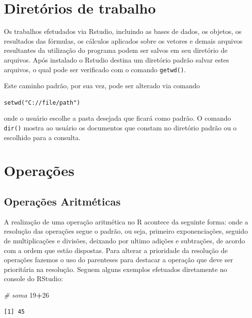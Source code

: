 \documentclass[12pt,portuguese,oneside]{book}
\newenvironment{Shaded}{\begin{snugshade}}{\end{snugshade}}
\newcommand{\DecValTok}[1]{\textcolor[rgb]{0.00,0.00,0.81}{#1}}
\newcommand{\CommentTok}[1]{\textcolor[rgb]{0.56,0.35,0.01}{\textit{#1}}}
\newcommand{\OperatorTok}[1]{\textcolor[rgb]{0.81,0.36,0.00}{\textbf{#1}}}
\begin{document}
\section{Diretórios de trabalho}\label{diretorios-de-trabalho}

Os trabalhos efetudados via Rstudio, incluindo as bases de dados, os
objetos, os resultados das fórmulas, os cálculos aplicados sobre os
vetores e demais arquivos resultantes da utilização do programa podem
ser salvos em seu diretório de arquivos. Após instalado o Rstudio
destina um diretório padrão salvar estes arquivos, o qual pode ser
verificado com o comando \texttt{getwd()}.

Este caminho padrão, por sua vez, pode ser alterado via comando

\texttt{setwd("C://file/path")}

onde o usuário escolhe a pasta desejada que ficará como padrão. O
comando \texttt{dir()} mostra ao usuário os documentos que constam no
diretório padrão ou o escolhido para a consulta.

\section{Operações}\label{operacoes}

\subsection{Operações Aritméticas}\label{operacoes-aritmeticas}

A realização de uma operação aritmética no R acontece da seguinte forma:
onde a resolução das operações segue o padrão, ou seja, primeiro
exponenciações, seguido de multiplicações e divisões, deixando por
ultimo adições e subtrações, de acordo com a ordem que estão dispostas.
Para alterar a prioridade da resolução de operações fazemos o uso do
parenteses para destacar a operação que deve ser prioritária na
resolução. Seguem alguns exemplos efetuados diretamente no console do
RStudio:

\begin{Shaded}
\begin{Highlighting}[]
\CommentTok{# soma}
\DecValTok{19}\OperatorTok{+}\DecValTok{26}
\end{Highlighting}
\end{Shaded}

\begin{verbatim}
[1] 45
\end{verbatim}
\end{document}
